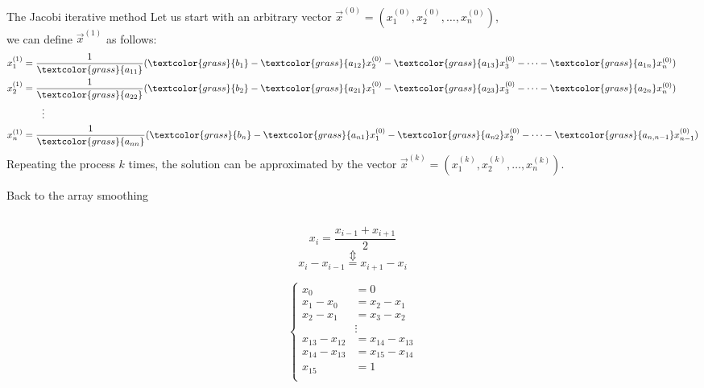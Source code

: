 \documentclass[UKenglish,aspectratio=169]{beamer}
\newcommand\known[1]{\textcolor{grass}{#1}}
\begin{document}
\begin{frame}{The Jacobi iterative method}
Let us start with an arbitrary vector $\vec{x}^{(0)}=\left(x_1^{(0)}, x_2^{(0)}, \dots, x_n^{(0)}\right)$,\\
\pause
we can define $\vec{x}^{(1)}$ as follows:
\begin{align*}
x_1^{(1)} &= \frac{1}{\known{a_{11}}}(\known{b_1} - \known{a_{12}}x_2^{(0)} - \known{a_{13}}x_3^{(0)} - \cdots - \known{a_{1n}}x_n^{(0)})\\
x_2^{(1)} &= \frac{1}{\known{a_{22}}}(\known{b_2} - \known{a_{21}}x_1^{(0)} - \known{a_{23}}x_3^{(0)} - \cdots - \known{a_{2n}}x_n^{(0)})\\
    & \qquad \vdots \\
x_n^{(1)} &= \frac{1}{\known{a_{nn}}}(\known{b_n} - \known{a_{n1}}x_1^{(0)} - \known{a_{n2}}x_2^{(0)} - \cdots - \known{a_{n,n-1}}x_{n-1}^{(0)})
\end{align*}
\pause
Repeating the process $k$ times, the solution can be approximated by the vector $\vec{x}^{(k)}=\left(x_1^{(k)}, x_2^{(k)}, \dots, x_n^{(k)}\right)$.
\end{frame}

\begin{frame}{Back to the array smoothing}
\inputminted[frame=single]{python}{listings/example_3.1.py}
\pause
\begin{minipage}{.45\linewidth}
$$x_i = \frac{x_{i-1}+x_{i+1}}{2}$$
\pause 
$$\Updownarrow$$ $$ x_i-x_{i-1} = x_{i+1} - x_i$$
\end{minipage}
\pause
\begin{minipage}{.45\linewidth}
$$
\left\{
\begin{array}{rl}
 x_0 &= 0 \\
x_1-x_0 &= x_2-x_1 \\
x_2-x_1 &= x_3-x_2 \\
     &  \vdots \\
x_{13}-x_{12}     &= x_{14}-x_{13} \\
x_{14}-x_{13}     &= x_{15}-x_{14} \\
x_{15} &= 1 \\
\end{array}
\right.
$$
\end{minipage}
\end{frame}
\end{document}
